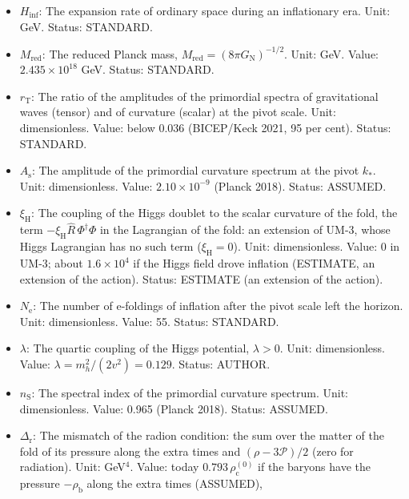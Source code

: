 \documentclass[
  10pt,
]{article}
\begin{document}
\begin{itemize}
  times (ASSUMED), \(-0.842\,\rho_{\mathrm{c}}^{(0)}\) if they have
  none, \(-0.891\,\rho_{\mathrm{c}}^{(0)}\) for \(+\rho_{\mathrm{b}}\).
  Status: DERIVED (the value), ASSUMED (that the fold fluid supplies
  it).
\item
  \(H_{\mathrm{inf}}\): The expansion rate of ordinary space during an
  inflationary era. Unit: GeV. Status: STANDARD.
\item
  \(M_{\mathrm{red}}\): The reduced Planck mass,
  \(M_{\mathrm{red}} = (8\pi G_{\mathrm{N}})^{-1/2}\). Unit: GeV. Value:
  \(2.435\times10^{18}\) GeV. Status: STANDARD.
\item
  \(r_{\mathrm{T}}\): The ratio of the amplitudes of the primordial
  spectra of gravitational waves (tensor) and of curvature (scalar) at
  the pivot scale. Unit: dimensionless. Value: below 0.036 (BICEP/Keck
  2021, 95 per cent). Status: STANDARD.
\item
  \(A_{\mathrm{s}}\): The amplitude of the primordial curvature spectrum
  at the pivot \(k_*\). Unit: dimensionless. Value:
  \(2.10\times10^{-9}\) (Planck 2018). Status: ASSUMED.
\item
  \(\xi_{\mathrm{H}}\): The coupling of the Higgs doublet to the scalar
  curvature of the fold, the term
  \(-\xi_{\mathrm{H}}\hat R\,\Phi^\dagger\Phi\) in the Lagrangian of the
  fold: an extension of UM-3, whose Higgs Lagrangian has no such term
  (\(\xi_{\mathrm{H}} = 0\)). Unit: dimensionless. Value: 0 in UM-3;
  about \(1.6\times10^4\) if the Higgs field drove inflation (ESTIMATE,
  an extension of the action). Status: ESTIMATE (an extension of the
  action).
\item
  \(N_{\mathrm{e}}\): The number of e-foldings of inflation after the
  pivot scale left the horizon. Unit: dimensionless. Value: 55. Status:
  STANDARD.
\item
  \(\lambda\): The quartic coupling of the Higgs potential,
  \(\lambda > 0\). Unit: dimensionless. Value:
  \(\lambda = m_h^2/(2v^2) = 0.129\). Status: AUTHOR.
\item
  \(n_{\mathrm{S}}\): The spectral index of the primordial curvature
  spectrum. Unit: dimensionless. Value: 0.965 (Planck 2018). Status:
  ASSUMED.
\item
  \(\Delta_{\mathrm{r}}\): The mismatch of the radion condition: the sum
  over the matter of the fold of its pressure along the extra times and
  \((\rho - 3\mathcal{P})/2\) (zero for radiation). Unit: GeV\(^4\).
  Value: today \(0.793\,\rho_{\mathrm{c}}^{(0)}\) if the baryons have
  the pressure \(-\rho_{\mathrm{b}}\) along the extra times (ASSUMED),

\end{itemize}
\end{document}
